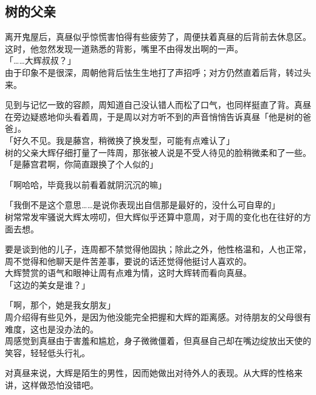 \subsection{树的父亲}

离开鬼屋后，真昼似乎惊慌害怕得有些疲劳了，周便扶着真昼的后背前去休息区。这时，他忽然发现一道熟悉的背影，嘴里不由得发出啊的一声。\\

「……大辉叔叔？」\\

由于印象不是很深，周朝他背后怯生生地打了声招呼；对方仍然直着后背，转过头来。

见到与记忆一致的容颜，周知道自己没认错人而松了口气，也同样挺直了背。真昼在旁边疑惑地仰头看着周，于是周以对方听不到的声音悄悄告诉真昼「他是树的爸爸」。\\

「好久不见。我是藤宫，稍微换了换发型，可能有点难认了」\\

树的父亲大辉仔细打量了一阵周，那张被人说是不受人待见的脸稍微柔和了一些。\\

「是藤宫君啊，你简直跟换了个人似的」

「啊哈哈，毕竟我以前看着就阴沉沉的嘛」

「我倒不是这个意思……是说你表现出自信那是最好的，没什么可自卑的」\\

树常常发牢骚说大辉太唠叨，但大辉似乎还算中意周，对于周的变化也在往好的方面去想。

要是谈到他的儿子，连周都不禁觉得他固执；除此之外，他性格温和，人也正常，周不觉得和他聊天是件苦差事，要说的话还觉得他挺讨人喜欢的。\\

大辉赞赏的语气和眼神让周有点难为情，这时大辉转而看向真昼。\\

「这边的美女是谁？」

「啊，那个，她是我女朋友」\\

周介绍得有些见外，是因为他没能完全把握和大辉的距离感。对待朋友的父母很有难度，这也是没办法的。\\

周感觉到真昼由于害羞和尴尬，身子微微僵着，但真昼自己却在嘴边绽放出天使的笑容，轻轻低头行礼。

对真昼来说，大辉是陌生的男性，因而她做出对待外人的表现。从大辉的性格来讲，这样做恐怕没错吧。\\

